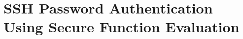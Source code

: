 \chapter{SSH Password Authentication Using Secure Function Evaluation}
\label{chapter:pw}

%















